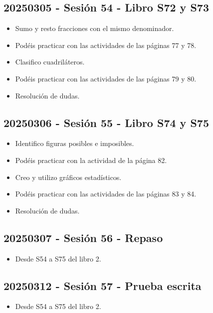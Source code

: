 \documentclass[a4paper,12pt]{article}
\begin{document}
\subsection{20250305 - Sesión 54 - Libro S72 y S73}

\begin{itemize}
    \item Sumo y resto fracciones con el mismo denominador.
    \item Podéis practicar con las actividades de las páginas 77 y 78.
    \item Clasifico cuadriláteros.
    \item Podéis practicar con las actividades de las páginas 79 y 80.
    \item Resolución de dudas.
\end{itemize}

\subsection{20250306 - Sesión 55 - Libro S74 y S75}

\begin{itemize}
    \item Identifico figuras posibles e imposibles.
    \item Podéis practicar con la actividad de la página 82.
    \item Creo y utilizo gráficos estadísticos.
    \item Podéis practicar con las actividades de las páginas 83 y 84.
    \item Resolución de dudas.
\end{itemize}

\subsection{20250307 - Sesión  56 - Repaso}

\begin{itemize}
    \item Desde S54 a S75 del libro 2.
\end{itemize}

\subsection{20250312 - Sesión 57 - Prueba escrita}

\begin{itemize}
    \item Desde S54 a S75 del libro 2.
\end{itemize}
\end{document}
